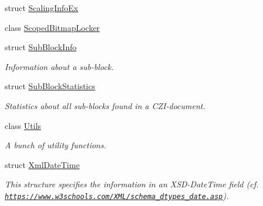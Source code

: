 \begin{DoxyCompactItemize}
struct \hyperlink{structlib_c_z_i_1_1_scaling_info_ex}{Scaling\+Info\+Ex}
\item 
class \hyperlink{classlib_c_z_i_1_1_scoped_bitmap_locker}{Scoped\+Bitmap\+Locker}
\item 
struct \hyperlink{structlib_c_z_i_1_1_sub_block_info}{Sub\+Block\+Info}
\begin{DoxyCompactList}\small\item\em Information about a sub-\/block. \end{DoxyCompactList}\item 
struct \hyperlink{structlib_c_z_i_1_1_sub_block_statistics}{Sub\+Block\+Statistics}
\begin{DoxyCompactList}\small\item\em Statistics about all sub-\/blocks found in a C\+Z\+I-\/document. \end{DoxyCompactList}\item 
class \hyperlink{classlib_c_z_i_1_1_utils}{Utils}
\begin{DoxyCompactList}\small\item\em A bunch of utility functions. \end{DoxyCompactList}\item 
struct \hyperlink{structlib_c_z_i_1_1_xml_date_time}{Xml\+Date\+Time}
\begin{DoxyCompactList}\small\item\em This structure specifies the information in an X\+S\+D-\/\+Date\+Time field (cf. \href{https://www.w3schools.com/XML/schema_dtypes_date.asp}{\tt https\+://www.\+w3schools.\+com/\+X\+M\+L/schema\+\_\+dtypes\+\_\+date.\+asp}). \end{DoxyCompactList}\end{DoxyCompactItemize}
